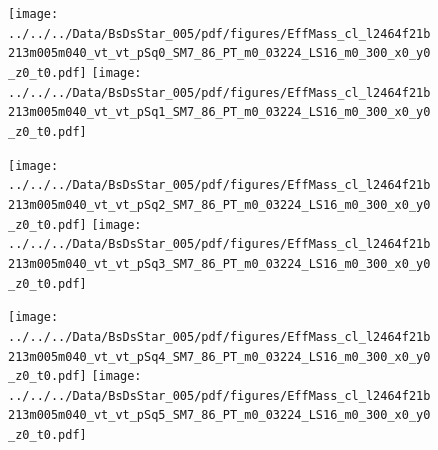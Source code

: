 \documentclass[a4paper,10pt]{article}
\begin{document}
\clearpage
\begin{figure}[p]
 \texttt{[image: ../../../Data/BsDsStar\_005/pdf/figures/EffMass\_cl\_l2464f21b213m005m040\_vt\_vt\_pSq0\_SM7\_86\_PT\_m0\_03224\_LS16\_m0\_300\_x0\_y0\_z0\_t0.pdf]} 
 \texttt{[image: ../../../Data/BsDsStar\_005/pdf/figures/EffMass\_cl\_l2464f21b213m005m040\_vt\_vt\_pSq1\_SM7\_86\_PT\_m0\_03224\_LS16\_m0\_300\_x0\_y0\_z0\_t0.pdf]} 
 \end{figure}
\begin{figure}[p]
 \texttt{[image: ../../../Data/BsDsStar\_005/pdf/figures/EffMass\_cl\_l2464f21b213m005m040\_vt\_vt\_pSq2\_SM7\_86\_PT\_m0\_03224\_LS16\_m0\_300\_x0\_y0\_z0\_t0.pdf]} 
 \texttt{[image: ../../../Data/BsDsStar\_005/pdf/figures/EffMass\_cl\_l2464f21b213m005m040\_vt\_vt\_pSq3\_SM7\_86\_PT\_m0\_03224\_LS16\_m0\_300\_x0\_y0\_z0\_t0.pdf]} 
 \end{figure}
\begin{figure}[p]
 \texttt{[image: ../../../Data/BsDsStar\_005/pdf/figures/EffMass\_cl\_l2464f21b213m005m040\_vt\_vt\_pSq4\_SM7\_86\_PT\_m0\_03224\_LS16\_m0\_300\_x0\_y0\_z0\_t0.pdf]} 
 \texttt{[image: ../../../Data/BsDsStar\_005/pdf/figures/EffMass\_cl\_l2464f21b213m005m040\_vt\_vt\_pSq5\_SM7\_86\_PT\_m0\_03224\_LS16\_m0\_300\_x0\_y0\_z0\_t0.pdf]} 
 \end{figure}
\clearpage
\clearpage
\end{document}
